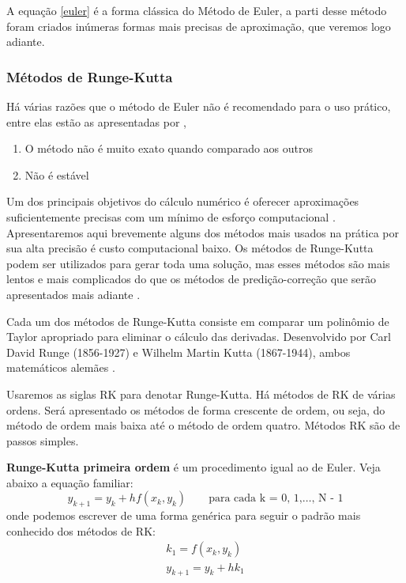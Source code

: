 A equação \ref{euler} é a forma clássica do Método de Euler, a parti desse método foram criados inúmeras formas mais precisas de aproximação, que veremos logo adiante.

\subsubsection{Métodos de Runge-Kutta}

Há várias razões que o método de Euler não é recomendado para
o uso prático, entre elas estão as apresentadas por ,
\begin{enumerate}[label=\roman*.]
\item O método não é muito exato quando comparado aos outros
\item Não é estável
\end{enumerate}


Um dos principais objetivos do cálculo numérico é oferecer aproximações
suficientemente precisas com um mínimo de esforço computacional \cite{faires}.
Apresentaremos aqui brevemente alguns dos métodos mais usados na prática
por sua alta precisão é custo computacional baixo. Os métodos de Runge-Kutta
podem ser utilizados para gerar toda uma solução, mas esses métodos são mais lentos
e mais complicados do que os métodos de predição-correção que serão apresentados mais
adiante \cite{bronson}.

Cada um dos métodos de Runge-Kutta consiste em comparar um polinômio de
Taylor apropriado para eliminar o cálculo das derivadas. Desenvolvido por
Carl David Runge (1856-1927) e Wilhelm Martin Kutta (1867-1944), ambos matemáticos
alemães \cite{valle}.

Usaremos as siglas RK para denotar Runge-Kutta. Há métodos de RK  de várias ordens.
Será apresentado os métodos de forma crescente de ordem, ou seja, do método de ordem
mais baixa até o método de ordem quatro. Métodos RK são de passos simples.

\textbf{Runge-Kutta primeira ordem} é um procedimento igual ao de Euler.
Veja abaixo a equação familiar:
\begin{equation*}
y_{k+1} = y_{k} + hf(x_{k},y_{k})
\qquad \text{para cada k = 0, 1,$\dotsc$, N - 1}
\end{equation*}
onde podemos escrever de uma forma genérica para seguir o padrão mais conhecido
dos métodos de RK:
\begin{equation*}
\begin{split}
k_{1} = f(x_{k},y_{k})\\
y_{k+1} = y_{k} + hk_{1}
\end{split}
\end{equation*}

